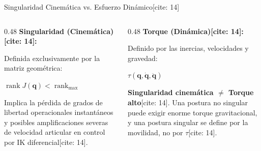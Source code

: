 \documentclass[aspectratio=169, xcolor={table,xcdraw}]{beamer}
\begin{document}
\begin{frame}{Singularidad Cinemática vs. Esfuerzo Dinámico[cite: 14]}
    \begin{columns}[T]
        \begin{column}{0.48\textwidth}
            \textbf{Singularidad (Cinemática)[cite: 14]:}
            
            Definida exclusivamente por la matriz geométrica:
            \begin{center}
                $\operatorname{rank}J(\mathbf{q}) < \operatorname{rank}_{\max}$ \text{[cite: 14]}
            \end{center}
            Implica la pérdida de grados de libertad operacionales instantáneos y posibles amplificaciones severas de velocidad articular en control por IK diferencial[cite: 14].
        \end{column}
        \begin{column}{0.48\textwidth}
            \textbf{Torque (Dinámica)[cite: 14]:}
            
            Definido por las inercias, velocidades y gravedad:
            \begin{center}
                $\tau(\mathbf{q}, \dot{\mathbf{q}}, \ddot{\mathbf{q}})$ \text{[cite: 14]}
            \end{center}
            \begin{tcolorbox}[colback=red!5, colframe=red!70!black, left=1mm, right=1mm]
                \small \textbf{Singularidad cinemática $\neq$ Torque alto}[cite: 14]. Una postura no singular puede exigir enorme torque gravitacional, y una postura singular se define por la movilidad, no por $\tau$[cite: 14].
            \end{tcolorbox}
        \end{column}
    \end{columns}
\end{frame}
\end{document}
